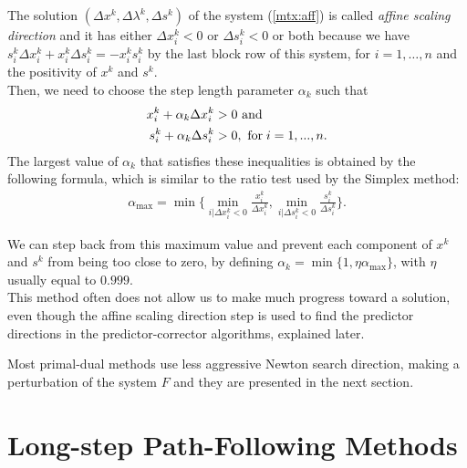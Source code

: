 \documentclass[a4paper,10 pt,titlepage,twoside]{book}
\theoremstyle{plain}
\theoremstyle{definition}
\theoremstyle{remark}
\begin{document}
The solution $\left(\Delta x^{k},\Delta\lambda^{k},\Delta s^{k}\right)$ of the system (\ref{mtx:aff}) is called \textit{affine scaling direction} and it has either $\Delta x_{i}^{k}<0$ or $\Delta s_{i}^{k}<0$ or both because we have $s^{k}_{i}\Delta x^{k}_{i} + x^{k}_{i}\Delta s^{k}_{i} = - x^{k}_{i}s^{k}_{i}$ by the last block row of this system, for $i=1,\dots,n$ and the positivity of $x^{k}$ and $s^{k}$.\\
Then, we need to choose the step length parameter $\alpha_{k}$ such that
\begin{align*}
x^{k}_{i} + \alpha_{k} \Delta x^{k}_{i} &>0 \text{ and}\\
s^{k}_{i} + \alpha_{k} \Delta s^{k}_{i} &>0,\text{ for\;} i = 1,...,n. 
\end{align*}
The largest value of $\alpha_{k}$ that satisfies these inequalities is obtained by the following formula, which is similar to the ratio test used by the Simplex method:
\begin{align*}
\alpha_{\text{max}} = \min\biggl\{\min_{i|\Delta x^{k}_{i}<0}\frac{x^{k}_{i}}{\Delta x^{k}_{i}}, \min_{i|\Delta s^{k}_{i}<0}\frac{s^{k}_{i}}{\Delta s^{k}_{i}}\biggr\}.
\end{align*} 

We can step back from this maximum value and prevent each component of $x^{k}$ and $s^{k}$ from being too close to zero, by defining $\alpha_{k} = \min\{1,\eta\alpha_{\text{max}}\}$, with $\eta$ usually equal to $0.999$.\\
This method often does not allow us to make much progress toward a solution, even though the affine scaling direction step is used to find the predictor directions in the predictor-corrector algorithms, explained later.

Most primal-dual methods use less aggressive Newton search direction, making a perturbation of the system $F$ and they are presented in the next section.

\section{Long-step Path-Following Methods}
\end{document}

